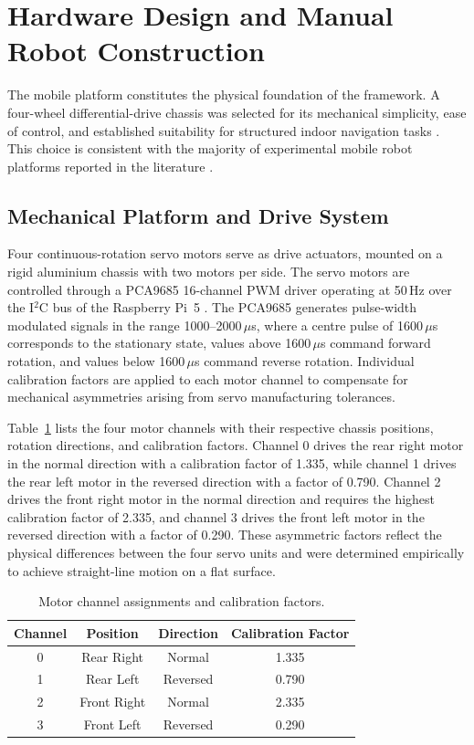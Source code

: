\section{Hardware Design and Manual Robot Construction}

The mobile platform constitutes the physical foundation of the
framework. A four-wheel differential-drive chassis was selected for
its mechanical simplicity, ease of control, and established suitability
for structured indoor navigation tasks \cite{r10,r11}. This choice
is consistent with the majority of experimental mobile robot platforms
reported in the literature \cite{r9,r18}.

\subsection{Mechanical Platform and Drive System}

Four continuous-rotation servo motors serve as drive actuators, mounted
on a rigid aluminium chassis with two motors per side. The servo motors
are controlled through a PCA9685 16-channel PWM driver
operating at 50\,Hz over the I$^2$C bus of the Raspberry Pi~5 \cite{r38}.
The PCA9685 generates pulse-width modulated signals in the range
1000--2000\,$\mu$s, where a centre pulse of 1600\,$\mu$s corresponds
to the stationary state, values above 1600\,$\mu$s command forward
rotation, and values below 1600\,$\mu$s command reverse rotation.
Individual calibration factors are applied to each motor channel to
compensate for mechanical asymmetries arising from servo manufacturing
tolerances.

Table~\ref{tab:motor} lists the four motor channels with their
respective chassis positions, rotation directions, and calibration
factors. Channel 0 drives the rear right motor in the normal direction
with a calibration factor of 1.335, while channel 1 drives the rear
left motor in the reversed direction with a factor of 0.790. Channel 2
drives the front right motor in the normal direction and requires the
highest calibration factor of 2.335, and channel 3 drives the front
left motor in the reversed direction with a factor of 0.290. These
asymmetric factors reflect the physical differences between the four
servo units and were determined empirically to achieve straight-line
motion on a flat surface.

\begin{table}[tbp]
  \centering
  \caption{Motor channel assignments and calibration factors.}
  \label{tab:motor}
  \begin{tabular}{cccc}
    \toprule
    Channel & Position    & Direction & Calibration Factor \\
    \midrule
    0       & Rear Right  & Normal    & 1.335 \\
    1       & Rear Left   & Reversed  & 0.790 \\
    2       & Front Right & Normal    & 2.335 \\
    3       & Front Left  & Reversed  & 0.290 \\
    \bottomrule
  \end{tabular}
\end{table}


